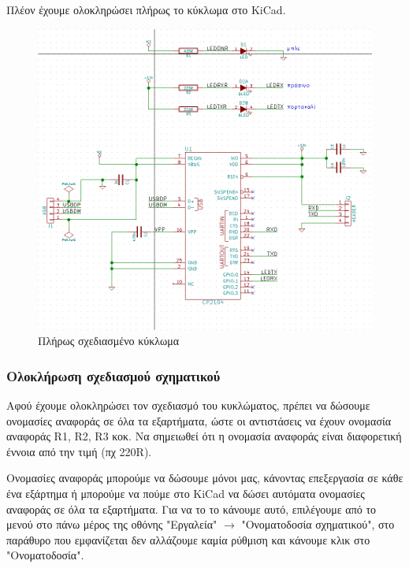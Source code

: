 \documentclass[a4paper]{article}
\begin{document}
Πλέον έχουμε ολοκληρώσει πλήρως το κύκλωμα στο \textenglish{KiCad}.

\begin{figure}
  \begin{center}
    \includegraphics{img/final-schem.png}
    \caption{Πλήρως σχεδιασμένο κύκλωμα}
    \label{fig:final-schem}
  \end{center}
\end{figure}

\subsubsection{Ολοκλήρωση σχεδιασμού σχηματικού}
Αφού έχουμε ολοκληρώσει τον σχεδιασμό του κυκλώματος, πρέπει να δώσουμε ονομασίες αναφοράς σε όλα τα εξαρτήματα, ώστε οι αντιστάσεις να έχουν ονομασία αναφοράς R1, R2, R3 κοκ. Να σημειωθεί ότι η ονομασία αναφοράς είναι διαφορετική έννοια από την τιμή (πχ 220R). 

Ονομασίες αναφοράς μπορούμε να δώσουμε μόνοι μας, κάνοντας επεξεργασία σε κάθε ένα εξάρτημα ή μπορούμε να πούμε στο \textenglish{KiCad} να δώσει αυτόματα ονομασίες αναφοράς σε όλα τα εξαρτήματα. Για να το το κάνουμε αυτό, επιλέγουμε από το μενού στο πάνω μέρος της οθόνης "Εργαλεία" $\rightarrow$ "Ονοματοδοσία σχηματικού", στο παράθυρο που εμφανίζεται δεν αλλάζουμε καμία ρύθμιση και κάνουμε κλικ στο "Ονοματοδοσία".

\begin{figure}
  \begin{center}
    \label{fig:kicad-main}
  \end{center}
\end{figure}
\end{document}
